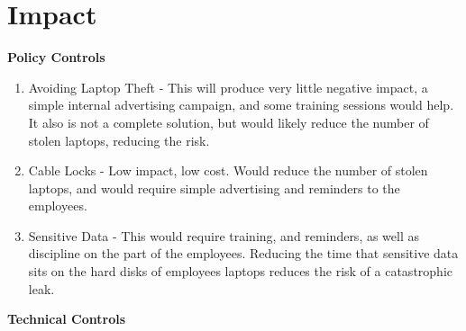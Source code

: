 \documentclass[paper=a4, fontsize=11pt]{scrartcl} %
\numberwithin{equation}{section} %
\numberwithin{figure}{section} %
\numberwithin{table}{section} %
\begin{document}
\section{Impact}
\label{sec:impact}
	\textbf{Policy Controls}
	\begin{enumerate}
		\item Avoiding Laptop Theft - This will produce very little negative impact, a simple internal advertising campaign, and some training sessions would help.  It also is not a complete solution, but would likely reduce the number of stolen laptops, reducing the risk.
		\item Cable Locks - Low impact, low cost.  Would reduce the number of stolen laptops, and would require simple advertising and reminders to the employees.
		\item Sensitive Data - This would require training, and reminders, as well as discipline on the part of the employees. Reducing the time that sensitive data sits on the hard disks of employees laptops reduces the risk of a catastrophic leak.
	\end{enumerate}
	\textbf{Technical Controls}
\end{document}
